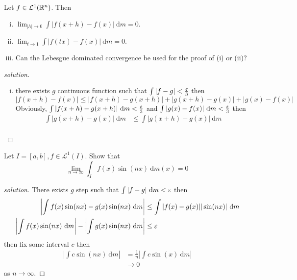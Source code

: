 \begin{problem}
  Let $f \in \mathcal{L}^1(\mathbb R^n)$. Then
  \begin{enumerate}[(i)]
    \item $\lim_{|h| \to 0} \int |f(x+h) - f(x)|\ \mathrm{d}m = 0$.
    \item $\lim_{t \to 1} \int |f(tx) - f(x)|\ \mathrm{d}m = 0$.
    \item Can the Lebesgue dominated convergence be used for the proof of (i) or (ii)?
  \end{enumerate}
\end{problem}

\begin{proof}[solution]
\begin{enumerate}[(i)]
  \item there exists $g$ continuous function such that $\int |f-g| < \frac{\varepsilon}3$ then
  \[|f(x+h) - f(x)| \le |f(x+h) - g(x+h)| + |g(x+h) - g(x)| + |g(x) - f(x)|\]
  Obviously, $\int |f(x+h) - g(x+h)| \ \mathrm{d}m < \frac\eps3$ and $\int |g(x) - f(x)| \ \mathrm{d}m < \frac{\varepsilon}3$ then
  \begin{align*}
    \int |g(x+h) - g(x)| \ \mathrm{d}m &\le \int |g(x+h) - g(x)| \ \mathrm{d}m\\
  \end{align*}
\end{enumerate}
\end{proof}

\begin{problem}
  Let $I = [a, b], f \in \mathcal{L}^1(I)$. Show that
  \[\lim_{n\to\infty} \int_I f(x)\sin(nx)\ \mathrm{d}m(x) = 0\]
\end{problem}

\begin{proof}[solution]
  There exists $g$ step such that $\int |f-g| \ \mathrm{d}m < \varepsilon$ then 
  \begin{align*}
    \left|\int f(x)\sin(nx) - g(x)\sin(nx) \ \mathrm{d}m\right| &\le \int |f(x) - g(x)||\sin(nx)|\ \mathrm{d}m\\ 
    \left|\int f(x)\sin(nx)\ \mathrm{d}m\right|- \left|\int g(x)\sin(nx) \ \mathrm{d}m\right|&\le \varepsilon
  \end{align*}
  then fix some interval $c$ then 
  \begin{align*}
    \left|\int c\sin(nx) \ \mathrm{d}m\right| &= \frac1n\left|\int c\sin(x) \ \mathrm{d}m\right|\\
    &\to 0
  \end{align*}
  as $n \to \infty$.
\end{proof}

